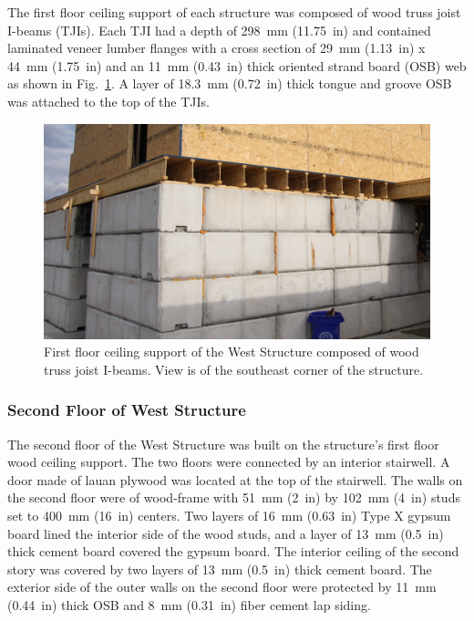 \documentclass[12pt,oneside]{book}
\begin{document}
The first floor ceiling support of each structure was composed of wood truss joist I-beams (TJIs). Each TJI had a depth of 298~mm (11.75~in) and contained laminated veneer lumber flanges with a cross section of 29~mm (1.13~in) x 44~mm (1.75~in) and an 11~mm (0.43~in) thick oriented strand board (OSB) web as shown in Fig.~\ref{fig:TJI}. A layer of 18.3~mm (0.72~in) thick tongue and groove OSB was attached to the top of the TJIs.

\begin{figure}[!ht]
	\includegraphics[width=6in]{../../Hose_Stream_Tests/Figures/Pictures/TJI_support}
	\caption[Ceiling support of the West Structure.]{First floor ceiling support of the West Structure composed of wood truss joist I-beams. View is of the southeast corner of the structure.}
	\label{fig:TJI}
\end{figure}
\FloatBarrier

\subsubsection{Second Floor of West Structure}
The second floor of the West Structure was built on the structure's first floor wood ceiling support. The two floors were connected by an interior stairwell. A door made of lauan plywood was located at the top of the stairwell. The walls on the second floor were of wood-frame with 51~mm (2~in) by 102~mm (4~in) studs set to 400~mm (16~in) centers. Two layers of 16~mm (0.63~in) Type X gypsum board lined the interior side of the wood studs, and a layer of 13~mm (0.5~in) thick cement board covered the gypsum board. The interior ceiling of the second story was covered by two layers of 13~mm (0.5~in) thick cement board. The exterior side of the outer walls on the second floor were protected by 11~mm (0.44~in) thick OSB and 8~mm (0.31~in) fiber cement lap siding.
\end{document}
